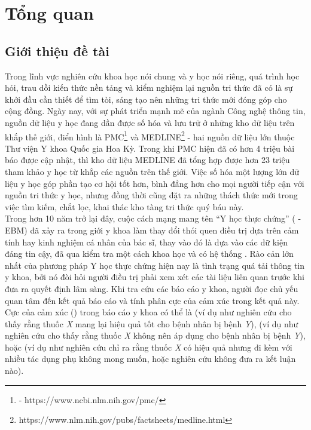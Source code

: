 \section{Tổng quan}
\subsection{Giới thiệu đề tài}
Trong lĩnh vực nghiên cứu khoa học nói chung và y học nói riêng, quá trình học hỏi, trau dồi kiến thức nền tảng và kiểm nghiệm lại nguồn tri thức đã có là sự khởi đầu cần thiết để tìm tòi, sáng tạo nên những tri thức mới đóng góp cho cộng đồng. Ngày nay, với sự phát triển mạnh mẽ của ngành Công nghệ thông tin, nguồn dữ liệu y học đang dần được số hóa và lưu trữ ở những kho dữ liệu trên khắp thế giới, điển hình là PMC\footnote{ - https://www.ncbi.nlm.nih.gov/pmc/} và MEDLINE\footnote{https://www.nlm.nih.gov/pubs/factsheets/medline.html} - hai nguồn dữ liệu lớn thuộc Thư viện Y khoa Quốc gia Hoa Kỳ. Trong khi PMC hiện đã có hơn 4 triệu bài báo được cập nhật, thì kho dữ liệu MEDLINE đã tổng hợp được hơn 23 triệu tham khảo y học từ khắp các nguồn trên thế giới. Việc số hóa một lượng lớn dữ liệu y học góp phần tạo cơ hội tốt hơn, bình đẳng hơn cho mọi người tiếp cận với nguồn tri thức y học, nhưng đồng thời cũng đặt ra những thách thức mới trong việc tìm kiếm, chắt lọc, khai thác kho tàng tri thức quý báu này.\\

Trong hơn 10 năm trở lại đây, cuộc cách mạng mang tên ``Y học thực chứng'' ( - EBM) đã xảy ra trong giới y khoa làm thay đổi thói quen điều trị dựa trên cảm tính hay kinh nghiệm cá nhân của bác sĩ, thay vào đó là dựa vào các dữ kiện đáng tin cậy, đã qua kiểm tra một cách khoa học và có hệ thống \cite{Nguyen2004}. Rào cản lớn nhất của phương pháp Y học thực chứng hiện nay là tình trạng quá tải thông tin y khoa, bởi nó đòi hỏi người điều trị phải xem xét các tài liệu liên quan trước khi đưa ra quyết định lâm sàng. Khi tra cứu các báo cáo y khoa, người đọc chủ yếu quan tâm đến kết quả báo cáo và tính phân cực của cảm xúc trong kết quả này. Cực của cảm xúc () trong báo cáo y khoa có thể là \tichcuc (ví dụ như nghiên cứu cho thấy rằng thuốc \textit{X} mang lại hiệu quả tốt cho bệnh nhân bị bệnh \textit{Y}), \tieucuc (ví dụ như nghiên cứu cho thấy rằng thuốc \textit{X} không nên áp dụng cho bệnh nhân bị bệnh \textit{Y}), hoặc \trungtinh (ví dụ như nghiên cứu chỉ ra rằng thuốc \textit{X} có hiệu quả nhưng đi kèm với nhiều tác dụng phụ không mong muốn, hoặc nghiên cứu không đưa ra kết luận nào).\\

